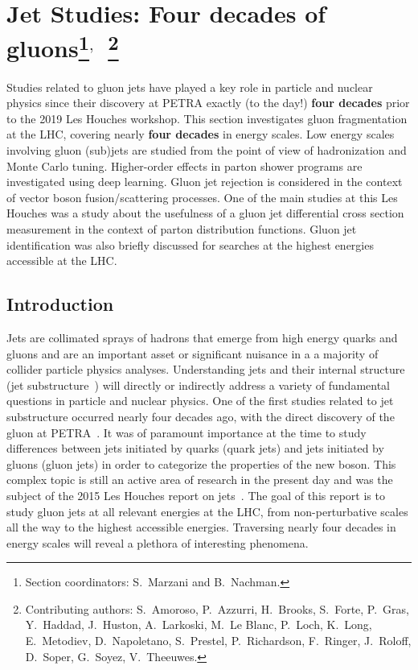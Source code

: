\documentclass[11pt]{cernrep}
\begin{document}
\section{Jet Studies: Four decades of gluons\protect\footnote{Section coordinators: S.~Marzani and B.~Nachman.}$^{,}$~\protect\footnote{Contributing authors: S.~Amoroso, P.~Azzurri, H.~Brooks, S.~Forte, P.~Gras, Y.~Haddad, J.~Huston, A.~Larkoski, M.~Le Blanc, P.~Loch, K.~Long, E.~Metodiev, D.~Napoletano, S.~Prestel, P.~Richardson, F.~Ringer, J.~Roloff, D.~Soper, G.~Soyez, V.~Theeuwes.}}

Studies related to gluon jets have played a key role in particle and nuclear physics since their discovery at PETRA exactly (to the day!) \textbf{four decades} prior to the 2019 Les Houches workshop.  This section investigates gluon fragmentation at the LHC, covering nearly \textbf{four decades} in energy scales.  Low energy scales involving gluon (sub)jets are studied from the point of view of hadronization and Monte Carlo tuning.  Higher-order effects in parton shower programs are investigated using deep learning.  Gluon jet rejection is considered in the context of vector boson fusion/scattering processes.  One of the main studies at this Les Houches was a study about the usefulness of a gluon jet differential cross section measurement in the context of parton distribution functions.  Gluon jet identification was also briefly discussed for searches at the highest energies accessible at the LHC.

\subsection{Introduction}
\label{sec:jets:intro}

Jets are collimated sprays of hadrons that emerge from high energy quarks and gluons and are an important asset or significant nuisance in a a majority of collider particle physics analyses.  Understanding jets and their internal structure (jet substructure~\cite{Abdesselam:2010pt,Altheimer:2012mn,Altheimer:2013yza,Adams:2015hiv,Asquith:2018igt,Larkoski:2017jix,Marzani:2019hun}) will directly or indirectly address a variety of fundamental questions in particle and nuclear physics.  One of the first studies related to jet substructure occurred nearly four decades ago, with the direct discovery of the gluon at PETRA~\cite{Brandelik:1979bd,Barber:1979yr,Berger:1979cj,Bartel:1979ut,Ellis:2014rma}.  It was of paramount importance at the time to study differences between jets initiated by quarks (quark jets) and jets initiated by gluons (gluon jets) in order to categorize the properties of the new boson.  This complex topic is still an active area of research in the present day and was the subject of the 2015 Les Houches report on jets~\cite{Badger:2016bpw,Gras:2017jty}.   The goal of this report is to study gluon jets at all relevant energies at the LHC, from non-perturbative scales all the way to the highest accessible energies.   Traversing nearly four decades in energy scales will reveal a plethora of interesting phenomena.  
\end{document}
